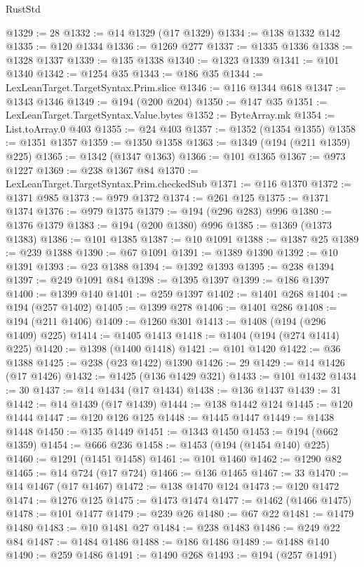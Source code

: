 \begin{lexlean}{RustStd}
\begin{coremodule}
@1329 := 28
@1332 := @14 @1329 (@17 @1329)
@1334 := @138 @1332 @142
@1335 := @120 @1334
@1336 := @1269 @277
@1337 := @1335 @1336
@1338 := @1328 @1337
@1339 := @135 @1338
@1340 := @1323 @1339
@1341 := @101 @1340
@1342 := @1254 @35
@1343 := @186 @35
@1344 := LexLeanTarget.TargetSyntax.Prim.slice
@1346 := @116 @1344 @618
@1347 := @1343 @1346
@1349 := @194 (@200 @204)
@1350 := @147 @35
@1351 := LexLeanTarget.TargetSyntax.Value.bytes
@1352 := ByteArray.mk
@1354 := List.toArray.{0} @403
@1355 := @24 @403
@1357 := @1352 (@1354 @1355)
@1358 := @1351 @1357
@1359 := @1350 @1358
@1363 := @1349 (@194 (@211 @1359) @225)
@1365 := @1342 (@1347 @1363)
@1366 := @101 @1365
@1367 := @973 @1227
@1369 := @238 @1367 @84
@1370 := LexLeanTarget.TargetSyntax.Prim.checkedSub
@1371 := @116 @1370
@1372 := @1371 @985
@1373 := @979 @1372
@1374 := @261 @125
@1375 := @1371 @1374
@1376 := @979 @1375
@1379 := @194 (@296 @283) @996
@1380 := @1376 @1379
@1383 := @194 (@200 @1380) @996
@1385 := @1369 (@1373 @1383)
@1386 := @101 @1385
@1387 := @10 @1091
@1388 := @1387 @25
@1389 := @239 @1388
@1390 := @67 @1091
@1391 := @1389 @1390
@1392 := @10 @1391
@1393 := @23 @1388
@1394 := @1392 @1393
@1395 := @238 @1394
@1397 := @249 @1091 @84
@1398 := @1395 @1397
@1399 := @186 @1397
@1400 := @1399 @140
@1401 := @259 @1397
@1402 := @1401 @268
@1404 := @194 (@257 @1402)
@1405 := @1399 @278
@1406 := @1401 @286
@1408 := @194 (@211 @1406)
@1409 := @1260 @301
@1413 := @1408 (@194 (@296 @1409) @225)
@1414 := @1405 @1413
@1418 := @1404 (@194 (@274 @1414) @225)
@1420 := @1398 (@1400 @1418)
@1421 := @101 @1420
@1422 := @36 @1388
@1425 := @238 (@23 @1422) @1390
@1426 := 29
@1429 := @14 @1426 (@17 @1426)
@1432 := @1425 (@136 @1429 @321)
@1433 := @101 @1432
@1434 := 30
@1437 := @14 @1434 (@17 @1434)
@1438 := @136 @1437
@1439 := 31
@1442 := @14 @1439 (@17 @1439)
@1444 := @138 @1442 @124
@1445 := @120 @1444
@1447 := @120 @126 @125
@1448 := @1445 @1447
@1449 := @1438 @1448
@1450 := @135 @1449
@1451 := @1343 @1450
@1453 := @194 (@662 @1359)
@1454 := @666 @236
@1458 := @1453 (@194 (@1454 @140) @225)
@1460 := @1291 (@1451 @1458)
@1461 := @101 @1460
@1462 := @1290 @82
@1465 := @14 @724 (@17 @724)
@1466 := @136 @1465
@1467 := 33
@1470 := @14 @1467 (@17 @1467)
@1472 := @138 @1470 @124
@1473 := @120 @1472
@1474 := @1276 @125
@1475 := @1473 @1474
@1477 := @1462 (@1466 @1475)
@1478 := @101 @1477
@1479 := @239 @26
@1480 := @67 @22
@1481 := @1479 @1480
@1483 := @10 @1481 @27
@1484 := @238 @1483
@1486 := @249 @22 @84
@1487 := @1484 @1486
@1488 := @186 @1486
@1489 := @1488 @140
@1490 := @259 @1486
@1491 := @1490 @268
@1493 := @194 (@257 @1491)

\end{coremodule}
\end{lexlean}
